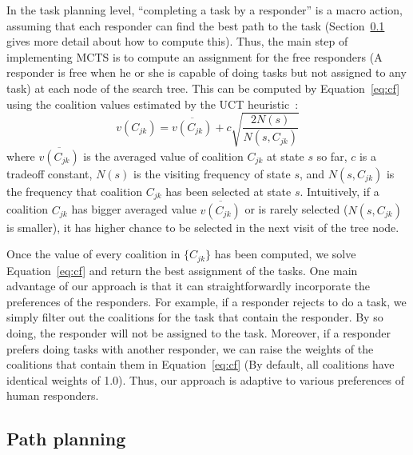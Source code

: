 In the task planning level, ``completing a task by a responder'' is
a macro action, assuming that each responder can find the best path
to the task (Section~\ref{sec:pathplanning} gives more detail about
how to compute this). Thus, the main step of implementing MCTS is
to compute an assignment for the free responders (A responder is
free when he or she is capable of doing tasks but not assigned to
any task) at each node of the search tree. This can be computed by
Equation~\ref{eq:cf} using the coalition values estimated by the
UCT heuristic~\cite{?}:
\begin{equation}
  v(C_{jk}) = \overline{v(C_{jk})} + c\sqrt{\frac{2N(s)}{N(s, C_{jk})}}
\end{equation}
where $\overline{v(C_{jk})}$ is the averaged value of coalition
$C_{jk}$ at state $s$ so far, $c$ is a tradeoff constant, $N(s)$ is
the visiting frequency of state $s$, and $N(s, C_{jk})$ is the
frequency that coalition $C_{jk}$ has been selected at state $s$.
Intuitively, if a coalition $C_{jk}$ has bigger averaged value
$\overline{v(C_{jk})}$ or is rarely selected ($N(s, C_{jk})$ is
smaller), it has higher chance to be selected in the next visit of
the tree node.

Once the value of every coalition in $\{ C_{jk} \}$ has been
computed, we solve Equation~\ref{eq:cf} and return the best
assignment of the tasks. One main advantage of our approach is that
it can straightforwardly incorporate the preferences of the
responders. For example, if a responder rejects to do a task, we
simply filter out the coalitions for the task that contain the
responder. By so doing, the responder will not be assigned to the
task. Moreover, if a responder prefers doing tasks with another
responder, we can raise the weights of the coalitions that contain
them in Equation~\ref{eq:cf} (By default, all coalitions have
identical weights of 1.0). Thus, our approach is adaptive to
various preferences of human responders.

\subsection{Path planning}
\label{sec:pathplanning}

